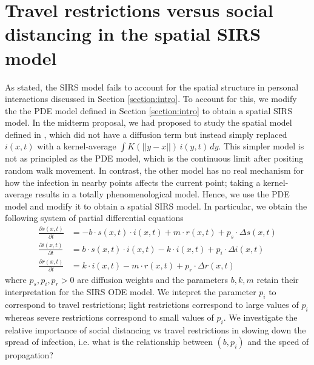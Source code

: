 \documentclass[12pt, reqno]{amsart}
\begin{document}
    \newpage

    \section{Travel restrictions versus social distancing in the spatial SIRS model} \label{appendix:sirs_pde}
    As stated, the SIRS model fails to account for the spatial structure in personal interactions discussed in Section \ref{section:intro}. To account for this, we modify the the PDE model defined in Section \ref{section:intro} to obtain a spatial SIRS model. In the midterm proposal, we had proposed to study the spatial model defined in \cite{baileySimulationStochasticEpidemics1967}, which did not have a diffusion term but instead simply replaced \(i(x, t)\) with a kernel-average \(\int K(||y-x||) \, i(y, t) \, dy\). This simpler model is not as principled as the PDE model, which is the continuous limit after positing random walk movement. In contrast, the other model has no real mechanism for how the infection in nearby points affects the current point; taking a kernel-average results in a totally phenomenological model. Hence, we use the PDE model and modify it to obtain a spatial SIRS model. In particular, we obtain the following system of partial differential equations 
    \begin{align*}
        \frac{\partial s(x, t)}{\partial t} &= -b \cdot s(x, t) \cdot i(x,t) + m \cdot r(x, t) + p_s \cdot \Delta s(x, t)\\
        \frac{\partial i(x, t)}{\partial t} &= b \cdot s(x, t) \cdot i(x, t) - k \cdot i(x, t) + p_i \cdot \Delta i(x, t) \\
        \frac{\partial r(x, t)}{\partial t} &= k \cdot i(x, t) - m \cdot r(x, t) + p_r \cdot \Delta r(x, t)
    \end{align*}
    where \(p_s, p_i, p_r > 0\) are diffusion weights and the parameters \(b, k, m\) retain their interpretation for the SIRS ODE model. We intepret the parameter \(p_i\) to correspond to travel restrictions; light restrictions correspond to large values of \(p_i\) whereas severe restrictions correspond to small values of \(p_i\). We investigate the relative importance of social distancing vs travel restrictions in slowing down the spread of infection, i.e. what is the relationship between \((b, p_i)\) and the speed of propagation?
    
\end{document}

